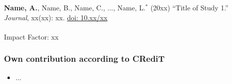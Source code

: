 \documentclass[float=true, crop=false]{standalone}
\begin{document}
\textbf{Name, A.}, Name, B., Name, C., ..., Name, L.$^{*}$ (20xx) \enquote{Title of Study 1.} \textit{Journal}, xx(xx): xx. \href{https://doi.org/10.xx/xx}{doi: 10.xx/xx}\\
\\
Impact Factor: xx\\

\subsubsection*{Own contribution according to CRediT}
\begin{itemize}
    \item ...
\end{itemize}
\end{document}
